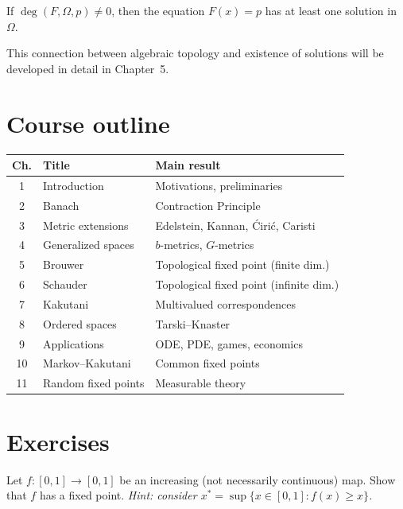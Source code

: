 \begin{theorem}
If $\deg(F, \Omega, p) \neq 0$, then the equation $F(x) = p$ has at least one
solution in $\Omega$.
\end{theorem}

This connection between algebraic topology and existence of solutions will be
developed in detail in Chapter~5.

\section{Course outline}

\begin{keyformulas}[title=\textbf{Course architecture}]
\begin{center}
\renewcommand{\arraystretch}{1.3}
\begin{tabular}{|c|l|l|}
\hline
\textbf{Ch.} & \textbf{Title} & \textbf{Main result} \\
\hline
1 & Introduction & Motivations, preliminaries \\
2 & Banach & Contraction Principle \\
3 & Metric extensions & Edelstein, Kannan, \'Ciri\'c, Caristi \\
4 & Generalized spaces & $b$-metrics, $G$-metrics \\
5 & Brouwer & Topological fixed point (finite dim.) \\
6 & Schauder & Topological fixed point (infinite dim.) \\
7 & Kakutani & Multivalued correspondences \\
8 & Ordered spaces & Tarski--Knaster \\
9 & Applications & ODE, PDE, games, economics \\
10 & Markov--Kakutani & Common fixed points \\
11 & Random fixed points & Measurable theory \\
\hline
\end{tabular}
\end{center}
\end{keyformulas}

\section{Exercises}

\begin{exercise}
Let $f : [0,1] \to [0,1]$ be an increasing (not necessarily continuous) map.
Show that $f$ has a fixed point.
\textit{Hint: consider $x^* = \sup\{x \in [0,1] : f(x) \geq x\}$.}
\end{exercise}

